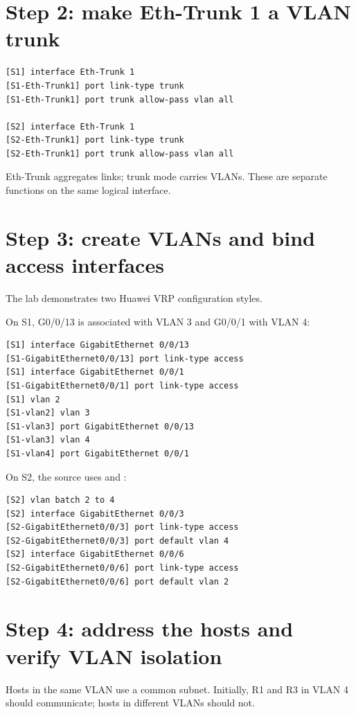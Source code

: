 \section{Step 2: make Eth-Trunk 1 a VLAN trunk}
\begin{lstlisting}[style=utpterminal]
[S1] interface Eth-Trunk 1
[S1-Eth-Trunk1] port link-type trunk
[S1-Eth-Trunk1] port trunk allow-pass vlan all

[S2] interface Eth-Trunk 1
[S2-Eth-Trunk1] port link-type trunk
[S2-Eth-Trunk1] port trunk allow-pass vlan all
\end{lstlisting}

\begin{keyidea}
Eth-Trunk aggregates links; trunk mode carries VLANs. These are separate functions on the same logical interface.
\end{keyidea}

\section{Step 3: create VLANs and bind access interfaces}
The lab demonstrates two Huawei VRP configuration styles.

On S1, G0/0/13 is associated with VLAN 3 and G0/0/1 with VLAN 4:
\begin{lstlisting}[style=utpterminal]
[S1] interface GigabitEthernet 0/0/13
[S1-GigabitEthernet0/0/13] port link-type access
[S1] interface GigabitEthernet 0/0/1
[S1-GigabitEthernet0/0/1] port link-type access
[S1] vlan 2
[S1-vlan2] vlan 3
[S1-vlan3] port GigabitEthernet 0/0/13
[S1-vlan3] vlan 4
[S1-vlan4] port GigabitEthernet 0/0/1
\end{lstlisting}

On S2, the source uses  and :
\begin{lstlisting}[style=utpterminal]
[S2] vlan batch 2 to 4
[S2] interface GigabitEthernet 0/0/3
[S2-GigabitEthernet0/0/3] port link-type access
[S2-GigabitEthernet0/0/3] port default vlan 4
[S2] interface GigabitEthernet 0/0/6
[S2-GigabitEthernet0/0/6] port link-type access
[S2-GigabitEthernet0/0/6] port default vlan 2
\end{lstlisting}

\section{Step 4: address the hosts and verify VLAN isolation}
Hosts in the same VLAN use a common subnet. Initially, R1 and R3 in VLAN 4 should communicate; hosts in different VLANs should not.

